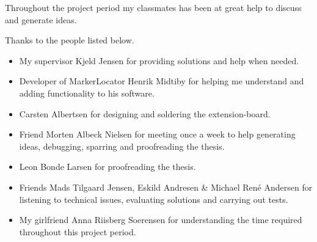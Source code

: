 Throughout the project period my classmates has been at great help to discuss and generate ideas.

Thanks to the people listed below.
\begin{itemize}
	\item My supervisor Kjeld Jensen for providing solutions and help when needed.
	\item Developer of MarkerLocator Henrik Midtiby for helping me understand and adding functionality to his software.
	\item Carsten Albertsen for designing and soldering the extension-board.
	\item Friend Morten Albeck Nielsen for meeting once a week to help generating ideas, debugging, sparring and proofreading the thesis.
	\item Leon Bonde Larsen for proofreading the thesis.
	\item Friends Mads Tilgaard Jensen, Eskild Andresen \& Michael René Andersen for listening to technical issues, evaluating solutions and carrying out tests.
	\item My girlfriend Anna Riisberg Soerensen for understanding the time required throughout this project period.
\end{itemize}
